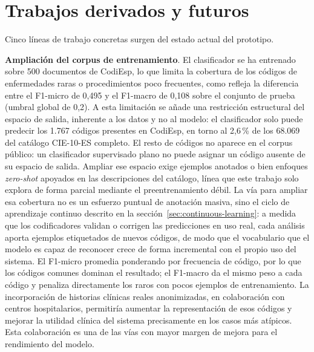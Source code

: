 \section{Trabajos derivados y futuros}

Cinco líneas de trabajo concretas surgen del estado actual del prototipo.

\textbf{Ampliación del corpus de entrenamiento}. El clasificador se ha entrenado sobre 500 documentos de CodiEsp, lo que limita la cobertura de los códigos de enfermedades raras o procedimientos poco frecuentes, como refleja la diferencia entre el F1-micro de 0,495 y el F1-macro de 0,108 sobre el conjunto de prueba (umbral global de 0,2). A esta limitación se añade una restricción estructural del espacio de salida, inherente a los datos y no al modelo: el clasificador solo puede predecir los 1.767 códigos presentes en CodiEsp, en torno al 2,6\,\% de los 68.069 del catálogo CIE-10-ES completo. El resto de códigos no aparece en el corpus público: un clasificador supervisado plano no puede asignar un código ausente de su espacio de salida. Ampliar ese espacio exige ejemplos anotados o bien enfoques \emph{zero-shot} apoyados en las descripciones del catálogo, línea que este trabajo solo explora de forma parcial mediante el preentrenamiento débil. La vía para ampliar esa cobertura no es un esfuerzo puntual de anotación masiva, sino el ciclo de aprendizaje continuo descrito en la sección~\ref{sec:continuous-learning}: a medida que los codificadores validan o corrigen las predicciones en uso real, cada análisis aporta ejemplos etiquetados de nuevos códigos, de modo que el vocabulario que el modelo es capaz de reconocer crece de forma incremental con el propio uso del sistema. El F1-micro promedia ponderando por frecuencia de código, por lo que los códigos comunes dominan el resultado; el F1-macro da el mismo peso a cada código y penaliza directamente los raros con pocos ejemplos de entrenamiento. La incorporación de historias clínicas reales anonimizadas, en colaboración con centros hospitalarios, permitiría aumentar la representación de esos códigos y mejorar la utilidad clínica del sistema precisamente en los casos más atípicos. Esta colaboración es una de las vías con mayor margen de mejora para el rendimiento del modelo.

